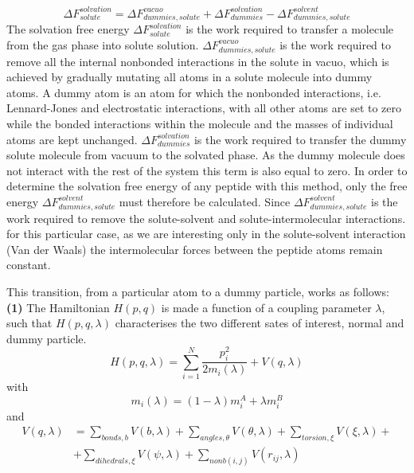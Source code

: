 \begin{equation}
    \Delta F_{solute}^{solvation} = \Delta F_{dummies,solute}^{vacuo} + \Delta F_{dummies}^{solvation} - \Delta F_{dummies,solute}^{solvent} 
\end{equation}  
The solvation free energy $\Delta F_{solute}^{solvation}$ is the work required to transfer a molecule from the gas phase into solute solution. $\Delta F_{dummies,solute}^{vacuo}$ is the work required to remove all the internal nonbonded interactions in the solute in vacuo, which is achieved by gradually mutating all atoms in a solute molecule into dummy atoms. A dummy atom is an atom for which the nonbonded interactions, i.e. Lennard-Jones and electrostatic interactions, with all other atoms are set to zero while the bonded interactions within the molecule and the masses of individual atoms are kept unchanged. $\Delta F_{dummies}^{solvation}$ is the work required to transfer the dummy solute molecule from
vacuum to the solvated phase. As the dummy molecule does not interact with the rest of the system this
term is also equal to zero. In order to determine the solvation free energy of any peptide with this method, only the free energy $\Delta F_{dummies,solute}^{solvent}$ must therefore be calculated. Since $\Delta F_{dummies,solute}^{solvent}$ is the work required to remove the solute-solvent and solute-intermolecular interactions. for this particular case, as we are interesting only in the solute-solvent interaction (Van der Waals) the intermolecular forces between the peptide atoms remain constant. 

This transition, from a particular atom to a dummy particle, works as follows:
\textbf{(1)} The Hamiltonian $H(p,q)$ is made a function of a coupling parameter $\lambda$, such that $H(p,q,\lambda)$ characterises the two different sates of interest, normal and dummy particle. 
\begin{equation}
    H(p,q,\lambda)=\sum^N_{i=1}\frac{p_i^2}{2m_i(\lambda)}+V(q,\lambda)
    \label{eq:Ham_lambda}
\end{equation}
with
\begin{equation}
    m_i(\lambda)=(1-\lambda)m_i^A +\lambda m_i^B
\end{equation}
and
\begin{equation}
    \begin{split}
        V(q,\lambda) &= \sum_{bonds,b} V(b,\lambda) + \sum_{angles,\theta} V(\theta,\lambda) + \sum_{torsion,\xi} V(\xi,\lambda)  + \\
        &   + \sum_{dihedrals,\xi} V(\psi,\lambda) + \sum_{nonb (i,j)} V(r_{ij},\lambda)
    \end{split}
    \label{eq:V_lambda}
\end{equation}

